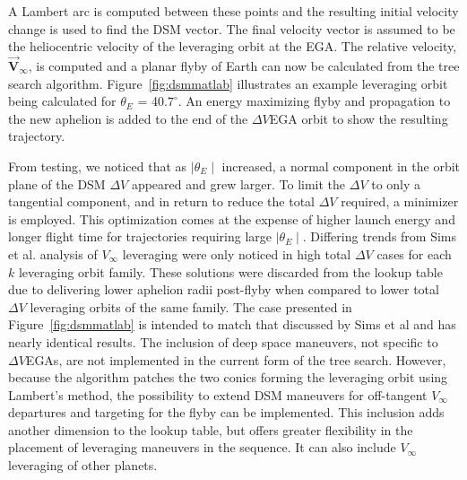 \documentclass[letterpaper, preprint, paper,11pt]{AAS}	%
\begin{document}
A Lambert arc is computed between these points and the resulting initial velocity change is used to find the DSM vector. The final velocity vector is assumed to be the heliocentric velocity of the leveraging orbit at the EGA. The relative velocity, $\vec{\textbf{V}}_{\infty}$, is computed and a planar flyby of Earth can now be calculated from the tree search algorithm. Figure~\ref{fig:dsmmatlab} illustrates an example leveraging orbit being calculated for $\theta_{E}$ = 40.$7^{\circ}$. An energy maximizing flyby and propagation to the new aphelion is added to the end of the $\Delta V$EGA orbit to show the resulting trajectory.

From testing, we noticed that as $\mid\theta_E\mid$ increased, a normal component in the orbit plane of the DSM $\Delta V$ appeared and grew larger. To limit the $\Delta V$ to only a tangential component, and in return to reduce the total $\Delta V$ required, a minimizer is employed. This optimization comes at the expense of higher launch energy and longer flight time for trajectories requiring large $\mid\theta_E\mid$. Differing trends from Sims et al. analysis of $V_\infty$ leveraging\cite{sims1994} were only noticed in high total $\Delta V$ cases for each $k$ leveraging orbit family. These solutions were discarded from the lookup table due to delivering lower aphelion radii post-flyby when compared to lower total $\Delta V$ leveraging orbits of the same family. The case presented in Figure~\ref{fig:dsmmatlab} is intended to match that discussed by Sims et al\cite{Sims1997} and has nearly identical results. The inclusion of deep space maneuvers, not specific to $\Delta V$EGAs, are not implemented in the current form of the tree search. However, because the algorithm patches the two conics forming the leveraging orbit using Lambert's method, the possibility to extend DSM maneuvers for off-tangent $V_\infty$ departures and targeting for the flyby can be implemented. This inclusion adds another dimension to the lookup table, but offers greater flexibility in the placement of  leveraging maneuvers in the sequence. It can also include $V_\infty$ leveraging of other planets.
\end{document}
